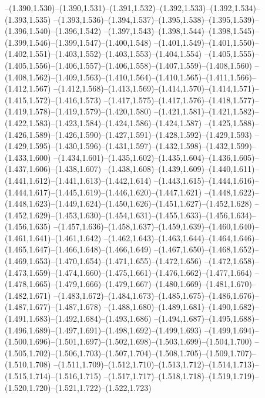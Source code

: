  --(1.390,1.530)--(1.390,1.531)--(1.391,1.532)--(1.392,1.533)--(1.392,1.534)--(1.393,1.535)%
  --(1.393,1.536)--(1.394,1.537)--(1.395,1.538)--(1.395,1.539)--(1.396,1.540)--(1.396,1.542)%
  --(1.397,1.543)--(1.398,1.544)--(1.398,1.545)--(1.399,1.546)--(1.399,1.547)--(1.400,1.548)%
  --(1.401,1.549)--(1.401,1.550)--(1.402,1.551)--(1.403,1.552)--(1.403,1.553)--(1.404,1.554)%
  --(1.405,1.555)--(1.405,1.556)--(1.406,1.557)--(1.406,1.558)--(1.407,1.559)--(1.408,1.560)%
  --(1.408,1.562)--(1.409,1.563)--(1.410,1.564)--(1.410,1.565)--(1.411,1.566)--(1.412,1.567)%
  --(1.412,1.568)--(1.413,1.569)--(1.414,1.570)--(1.414,1.571)--(1.415,1.572)--(1.416,1.573)%
  --(1.417,1.575)--(1.417,1.576)--(1.418,1.577)--(1.419,1.578)--(1.419,1.579)--(1.420,1.580)%
  --(1.421,1.581)--(1.421,1.582)--(1.422,1.583)--(1.423,1.584)--(1.424,1.586)--(1.424,1.587)%
  --(1.425,1.588)--(1.426,1.589)--(1.426,1.590)--(1.427,1.591)--(1.428,1.592)--(1.429,1.593)%
  --(1.429,1.595)--(1.430,1.596)--(1.431,1.597)--(1.432,1.598)--(1.432,1.599)--(1.433,1.600)%
  --(1.434,1.601)--(1.435,1.602)--(1.435,1.604)--(1.436,1.605)--(1.437,1.606)--(1.438,1.607)%
  --(1.438,1.608)--(1.439,1.609)--(1.440,1.611)--(1.441,1.612)--(1.441,1.613)--(1.442,1.614)%
  --(1.443,1.615)--(1.444,1.616)--(1.444,1.617)--(1.445,1.619)--(1.446,1.620)--(1.447,1.621)%
  --(1.448,1.622)--(1.448,1.623)--(1.449,1.624)--(1.450,1.626)--(1.451,1.627)--(1.452,1.628)%
  --(1.452,1.629)--(1.453,1.630)--(1.454,1.631)--(1.455,1.633)--(1.456,1.634)--(1.456,1.635)%
  --(1.457,1.636)--(1.458,1.637)--(1.459,1.639)--(1.460,1.640)--(1.461,1.641)--(1.461,1.642)%
  --(1.462,1.643)--(1.463,1.644)--(1.464,1.646)--(1.465,1.647)--(1.466,1.648)--(1.466,1.649)%
  --(1.467,1.650)--(1.468,1.652)--(1.469,1.653)--(1.470,1.654)--(1.471,1.655)--(1.472,1.656)%
  --(1.472,1.658)--(1.473,1.659)--(1.474,1.660)--(1.475,1.661)--(1.476,1.662)--(1.477,1.664)%
  --(1.478,1.665)--(1.479,1.666)--(1.479,1.667)--(1.480,1.669)--(1.481,1.670)--(1.482,1.671)%
  --(1.483,1.672)--(1.484,1.673)--(1.485,1.675)--(1.486,1.676)--(1.487,1.677)--(1.487,1.678)%
  --(1.488,1.680)--(1.489,1.681)--(1.490,1.682)--(1.491,1.683)--(1.492,1.684)--(1.493,1.686)%
  --(1.494,1.687)--(1.495,1.688)--(1.496,1.689)--(1.497,1.691)--(1.498,1.692)--(1.499,1.693)%
  --(1.499,1.694)--(1.500,1.696)--(1.501,1.697)--(1.502,1.698)--(1.503,1.699)--(1.504,1.700)%
  --(1.505,1.702)--(1.506,1.703)--(1.507,1.704)--(1.508,1.705)--(1.509,1.707)--(1.510,1.708)%
  --(1.511,1.709)--(1.512,1.710)--(1.513,1.712)--(1.514,1.713)--(1.515,1.714)--(1.516,1.715)%
  --(1.517,1.717)--(1.518,1.718)--(1.519,1.719)--(1.520,1.720)--(1.521,1.722)--(1.522,1.723)%
